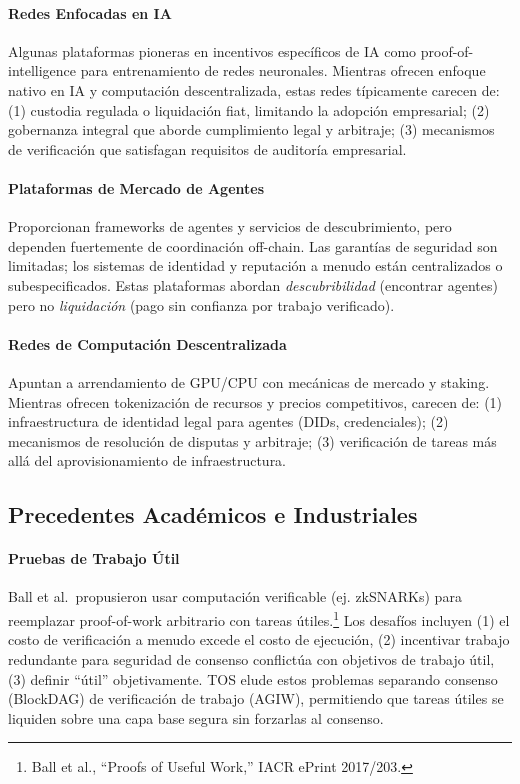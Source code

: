 \documentclass[11pt]{article}
\begin{document}
\paragraph{Redes Enfocadas en IA} Algunas plataformas pioneras en incentivos específicos de IA como proof-of-intelligence para entrenamiento de redes neuronales. Mientras ofrecen enfoque nativo en IA y computación descentralizada, estas redes típicamente carecen de: (1) custodia regulada o liquidación fiat, limitando la adopción empresarial; (2) gobernanza integral que aborde cumplimiento legal y arbitraje; (3) mecanismos de verificación que satisfagan requisitos de auditoría empresarial.

\paragraph{Plataformas de Mercado de Agentes} Proporcionan frameworks de agentes y servicios de descubrimiento, pero dependen fuertemente de coordinación off-chain. Las garantías de seguridad son limitadas; los sistemas de identidad y reputación a menudo están centralizados o subespecificados. Estas plataformas abordan \emph{descubribilidad} (encontrar agentes) pero no \emph{liquidación} (pago sin confianza por trabajo verificado).

\paragraph{Redes de Computación Descentralizada} Apuntan a arrendamiento de GPU/CPU con mecánicas de mercado y staking. Mientras ofrecen tokenización de recursos y precios competitivos, carecen de: (1) infraestructura de identidad legal para agentes (DIDs, credenciales); (2) mecanismos de resolución de disputas y arbitraje; (3) verificación de tareas más allá del aprovisionamiento de infraestructura.

\subsection{Precedentes Académicos e Industriales}
\paragraph{Pruebas de Trabajo Útil} Ball et al.\ propusieron usar computación verificable (ej. zkSNARKs) para reemplazar proof-of-work arbitrario con tareas útiles.\footnote{Ball et al., ``Proofs of Useful Work,'' IACR ePrint 2017/203.} Los desafíos incluyen (1) el costo de verificación a menudo excede el costo de ejecución, (2) incentivar trabajo redundante para seguridad de consenso conflictúa con objetivos de trabajo útil, (3) definir ``útil'' objetivamente. TOS elude estos problemas separando consenso (BlockDAG) de verificación de trabajo (AGIW), permitiendo que tareas útiles se liquiden sobre una capa base segura sin forzarlas al consenso.
\end{document}
